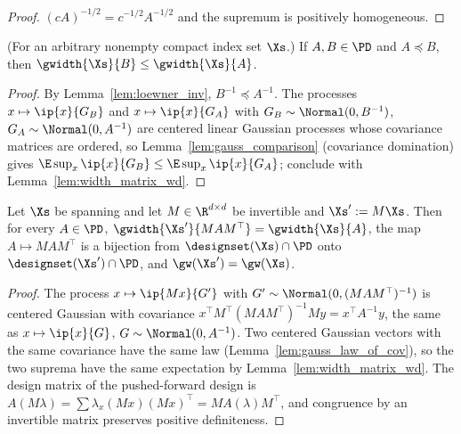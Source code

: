 \begin{proof}
\leanok
{}
$(cA)^{-1/2} = c^{-1/2}A^{-1/2}$ and the supremum is positively homogeneous.
\end{proof}

\begin{lemma}\label{lem:width_mono}
\leanok
{}
(For an arbitrary nonempty compact index set $\Xs$.) If $A, B \in \PD$ and $A \preceq B$, then $\gwidth{\Xs}{B} \le \gwidth{\Xs}{A}$.
\end{lemma}

\begin{proof}
\leanok
{}
By Lemma~\ref{lem:loewner_inv}, $B^{-1} \preceq A^{-1}$. The processes
$x \mapsto \ip{x}{G_B}$ and $x\mapsto\ip{x}{G_A}$ with $G_B\sim\Normal(0,B^{-1})$,
$G_A \sim \Normal(0,A^{-1})$ are centered linear Gaussian processes whose covariance matrices
are ordered, so Lemma~\ref{lem:gauss_comparison} (covariance domination) gives
$\E\sup_x\ip{x}{G_B} \le \E\sup_x\ip{x}{G_A}$; conclude with Lemma~\ref{lem:width_matrix_wd}.
\end{proof}

\begin{lemma}\label{lem:width_iso}
\leanok
{}
Let $\Xs$ be spanning and let $M \in \R^{d\times d}$ be invertible and $\Xs' := M\Xs$. Then for every $A \in \PD$,
$\gwidth{\Xs'}{MAM^\top} = \gwidth{\Xs}{A}$, the map $A \mapsto MAM^\top$ is a bijection
from $\designset(\Xs)\cap\PD$ onto $\designset(\Xs')\cap\PD$, and $\gw(\Xs') = \gw(\Xs)$.
\end{lemma}

\begin{proof}
\leanok
{}
The process $x \mapsto \ip{Mx}{G'}$ with $G' \sim \Normal(0,(MAM^\top)^{-1})$ is centered
Gaussian with covariance $x^\top M^\top (MAM^\top)^{-1} M y = x^\top A^{-1} y$, the same as
$x \mapsto \ip{x}{G}$, $G \sim \Normal(0,A^{-1})$. Two centered Gaussian vectors with the same
covariance have the same law (Lemma~\ref{lem:gauss_law_of_cov}), so the two suprema have the
same expectation by Lemma~\ref{lem:width_matrix_wd}. The design matrix of the pushed-forward
design is $A(M\lambda) = \sum \lambda_x (Mx)(Mx)^\top = MA(\lambda)M^\top$, and congruence by
an invertible matrix preserves positive definiteness.
\end{proof}


